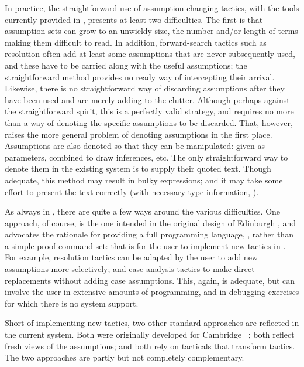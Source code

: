 In practice, the straightforward use of assumption-changing
tactics,
with the tools currently provided in \HOL, presents at
least two difficulties.  The first is that assumption sets can grow to an
unwieldy size, the number and/or length of terms making them difficult to
read.  In addition, forward-search tactics such as resolution often add at least
some assumptions that are never subsequently used, and these have to be
carried along with the useful assumptions; the straightforward
method provides no ready way of intercepting their arrival.
Likewise, there is no straightforward way of discarding
assumptions after they have been used and are merely adding to the clutter.
Although perhaps against the straightforward spirit, this is a perfectly valid
strategy, and
requires no more than a way of denoting
the specific assumptions to be discarded. That, however,
raises the more general problem of denoting assumptions in the first place.
Assumptions are also denoted
so that they can be
manipulated: given as parameters, combined to draw inferences, etc.  The only
straightforward way to denote them in the existing system is to supply
their quoted text.  Though adequate, this
method may result in bulky \ML{} expressions; and it may take some effort to present the text
correctly (with necessary type information, \etc).

As always in \HOL, there are quite a few ways around the various difficulties.
One approach, of course, is the one intended in the original
design of Edinburgh \LCF,
and advocates the rationale for providing a full programming language, \ML,
rather than a simple proof command set: that is for the user to
implement new tactics in \ML.  For example, resolution tactics can be adapted
by the user to add new assumptions more selectively; and case analysis tactics
to make direct replacements without adding case assumptions.
This, again, is adequate, but can involve the user in extensive amounts of
programming, and in debugging exercises for which there is no
system support.

Short of implementing new tactics, two other standard
approaches are reflected in the current system.  Both were originally
developed for Cambridge \LCF\ \cite{lcp_rewrite,new-LCF-man}; both reflect
fresh views of the assumptions; and both rely on tacticals that transform
tactics.  The two approaches are
partly but not completely complementary.

